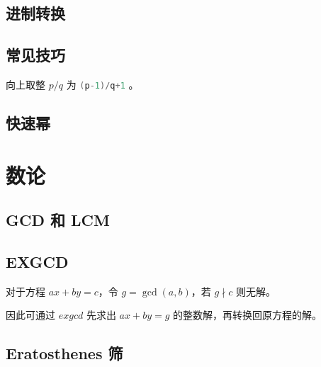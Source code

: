 \documentclass[cn,11pt,black,normal,founder]{elegantbook}
\begin{document}
\section{进制转换}



\section{常见技巧}

向上取整 $p/q$ 为 \lstinline[language=C++]{(p-1)/q+1} 。




%

\section{快速幂} %




\chapter{数论}

\section{GCD 和 LCM} %



\section{EXGCD} %

对于方程 $ax+by=c$，令 $g=\gcd(a,b)$，若 $g\nmid c$ 则无解。

因此可通过 $exgcd$ 先求出 $ax+by=g$ 的整数解，再转换回原方程的解。





\section{Eratosthenes 筛}
\end{document}
